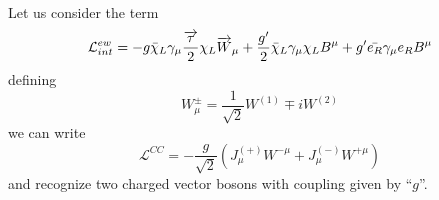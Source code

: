 Let us consider the term
\begin{equation}
  \label{eq:15}
  \mathcal{L}_{int}^{ew} = - g \bar{\chi}_{L} \gamma_{\mu}
  \frac{\overrightarrow{\tau}}{2} \chi_{L} \overrightarrow{W}_{\mu} + \frac{g'}{2}
  \bar{\chi}_{L} \gamma_{\mu} \chi_{L} B^{\mu} + g' \bar{e_{R}}
  \gamma_{\mu} e_{R} B^{\mu}
\end{equation}
defining
\begin{equation}
  \label{eq:16}
  W^{\pm}_{\mu} = \frac{1}{\sqrt{2}} W^{(1)} \mp i W^{(2)}
\end{equation}
we can write
\begin{equation}
  \label{eq:17}
  \mathcal{L}^{CC} = - \frac{g}{\sqrt{2}} (J^{(+)}_{\mu} W^{- \mu} +
  J^{(-)}_{\mu} W^{+ \mu})
\end{equation}
and recognize two charged vector bosons with coupling given by ``$g$''.
